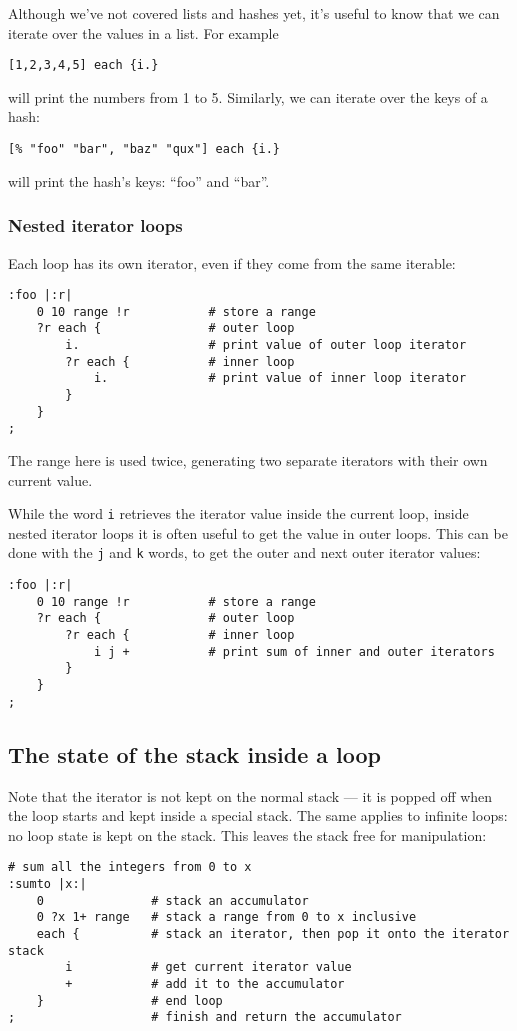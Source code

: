 Although we've not covered lists and hashes yet, it's useful to know that we can
iterate over the values in a list. For example
\begin{lstlisting}
[1,2,3,4,5] each {i.}
\end{lstlisting}
will print the numbers from 1 to 5. Similarly, we can iterate over the keys of a hash:
\begin{lstlisting}
[% "foo" "bar", "baz" "qux"] each {i.}
\end{lstlisting}
will print the hash's keys: ``foo'' and ``bar''.

\subsubsection{Nested iterator loops}
Each loop has its own iterator, even if they come from the same iterable:
\begin{lstlisting}
:foo |:r|
    0 10 range !r           # store a range
    ?r each {               # outer loop
        i.                  # print value of outer loop iterator
        ?r each {           # inner loop
            i.              # print value of inner loop iterator
        }
    }
;
\end{lstlisting}
The range here is used twice, generating two separate iterators with
their own current value.

While the word \texttt{i} retrieves the iterator value inside the current
loop, inside nested iterator loops it is often useful to get the value
in outer loops. This can be done with the \texttt{j} and \texttt{k} words,
to get the outer and next outer iterator values:
\begin{lstlisting}
:foo |:r|
    0 10 range !r           # store a range
    ?r each {               # outer loop
        ?r each {           # inner loop
            i j +           # print sum of inner and outer iterators
        }
    }
;
\end{lstlisting}

\subsection{The state of the stack inside a loop}
Note that the iterator is not kept on the normal stack --- it is popped
off when the loop starts and kept inside a special stack. The same
applies to infinite loops: no loop state is kept on the stack. This 
leaves the stack free for manipulation:
\begin{lstlisting}
# sum all the integers from 0 to x
:sumto |x:|
    0               # stack an accumulator
    0 ?x 1+ range   # stack a range from 0 to x inclusive
    each {          # stack an iterator, then pop it onto the iterator stack
        i           # get current iterator value
        +           # add it to the accumulator
    }               # end loop
;                   # finish and return the accumulator
\end{lstlisting}

